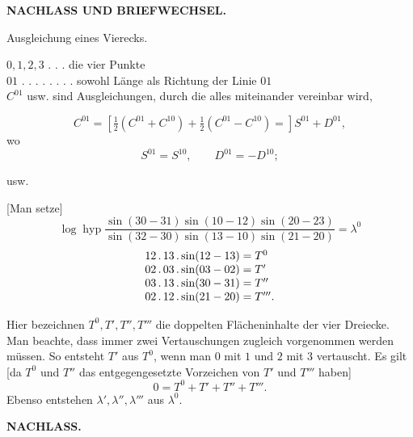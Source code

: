 \par\clearpage

\null\thispagestyle{empty}

\par\clearpage

\thispagestyle{empty}
\vspace*{3\baselineskip}
{\centering\Large\bfseries NACHLASS UND BRIEFWECHSEL.\par}
\vspace{3\baselineskip}
{\centering
[1.]\par\smallskip
Ausgleichung eines Vierecks.\par}
\begin{flushleft}
\hspace*{1.8em}\(0,1,2,3\) . . . die vier Punkte\\
\hspace*{1.8em}\(01\) . . . . . . . . sowohl Länge als Richtung der Linie \(01\)\\
\hspace*{1.8em}\(C^{01}\) usw. sind Ausgleichungen, durch die alles miteinander vereinbar wird,
\end{flushleft}
\[
 C^{01}=\left[\tfrac12(C^{01}+C^{10})+\tfrac12(C^{01}-C^{10})=\right]S^{01}+D^{01},
\]
\noindent wo
\[
 S^{01}=S^{10},\qquad D^{01}=-D^{10};
\]
{\centering usw.\par}

[Man setze]
\[
 \log\operatorname{hyp}
 \frac{\sin(30-31)\sin(10-12)\sin(20-23)}
      {\sin(32-30)\sin(13-10)\sin(21-20)}
 =\lambda^0
\]
\[
\begin{array}{@{}r@{\;=\;}l@{}}
 12\,.\,13\,.\sin(12-13)&T^0\\
 02\,.\,03\,.\sin(03-02)&T'\\
 03\,.\,13\,.\sin(30-31)&T''\\
 02\,.\,12\,.\sin(21-20)&T'''.
\end{array}
\]

Hier bezeichnen \(T^0,T',T'',T'''\) die doppelten Flächeninhalte der vier Dreiecke. Man beachte, dass immer zwei Vertauschungen zugleich vorgenommen werden müssen. So entsteht \(T'\) aus \(T^0\), wenn man \(0\) mit \(1\) und \(2\) mit \(3\) vertauscht. Es gilt [da \(T^0\) und \(T''\) das entgegengesetzte Vorzeichen von \(T'\) und \(T'''\) haben]
\[
 0=T^0+T'+T''+T'''.
\]
Ebenso entstehen \(\lambda',\lambda'',\lambda'''\) aus \(\lambda^0\).

\par\clearpage
\noindent{}\hfill{\small\textbf{NACHLASS.}}\hfill\null\par\medskip


